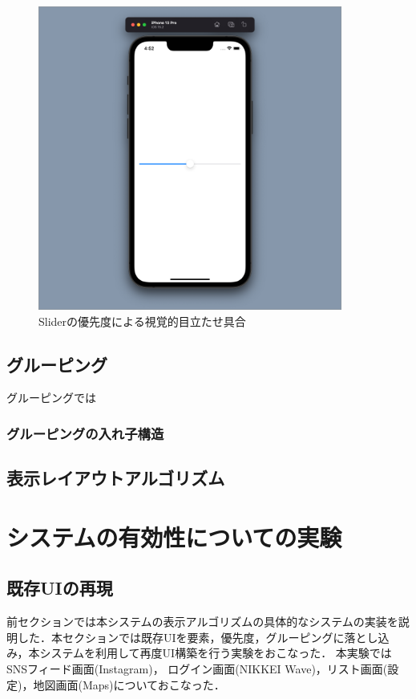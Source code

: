\begin{figure}[htbp]
  \begin{minipage}{\hsize}
    \begin{center}
       \includegraphics[width=100mm]{img/Slider_priority.png}
    \end{center}
    \caption{Sliderの優先度による視覚的目立たせ具合}
    \label{fig:slider_priority}
  \end{minipage}
\end{figure}


\subsection{グルーピング}
グルーピングでは
\subsubsection{グルーピングの入れ子構造}

\subsection{表示レイアウトアルゴリズム}

\section{システムの有効性についての実験}

\subsection{既存UIの再現}
前セクションでは本システムの表示アルゴリズムの具体的なシステムの実装を説明した．本セクションでは既存UIを要素，優先度，グルーピングに落とし込み，本システムを利用して再度UI構築を行う実験をおこなった．
本実験ではSNSフィード画面(Instagram)， ログイン画面(NIKKEI Wave)，リスト画面(設定)，地図画面(Maps)についておこなった．
